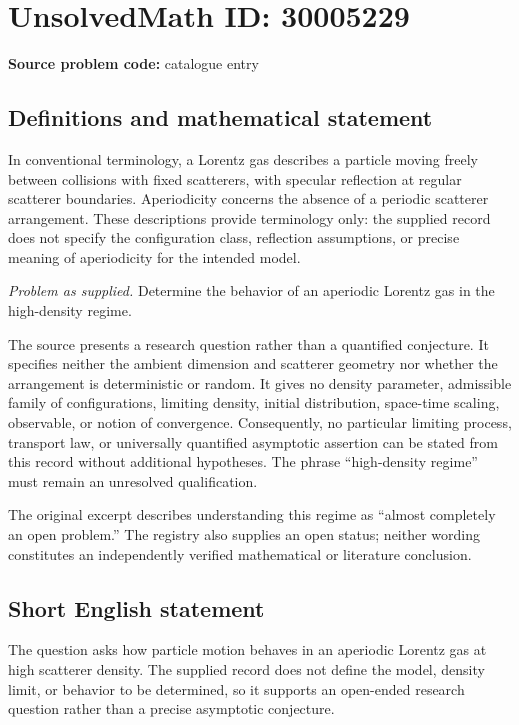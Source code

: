 \documentclass[11pt]{article}
\begin{document}
\section*{UnsolvedMath ID: 30005229}
\textbf{Source problem code:} catalogue entry
\subsection{Definitions and mathematical statement}
In conventional terminology, a Lorentz gas describes a particle moving freely between collisions with fixed scatterers, with specular reflection at regular scatterer boundaries. Aperiodicity concerns the absence of a periodic scatterer arrangement. These descriptions provide terminology only: the supplied record does not specify the configuration class, reflection assumptions, or precise meaning of aperiodicity for the intended model.

\emph{Problem as supplied.} Determine the behavior of an aperiodic Lorentz gas in the high-density regime.

The source presents a research question rather than a quantified conjecture. It specifies neither the ambient dimension and scatterer geometry nor whether the arrangement is deterministic or random. It gives no density parameter, admissible family of configurations, limiting density, initial distribution, space-time scaling, observable, or notion of convergence. Consequently, no particular limiting process, transport law, or universally quantified asymptotic assertion can be stated from this record without additional hypotheses. The phrase ``high-density regime'' must remain an unresolved qualification.

The original excerpt describes understanding this regime as ``almost completely an open problem.'' The registry also supplies an open status; neither wording constitutes an independently verified mathematical or literature conclusion.
\subsection{Short English statement}
The question asks how particle motion behaves in an aperiodic Lorentz gas at high scatterer density. The supplied record does not define the model, density limit, or behavior to be determined, so it supports an open-ended research question rather than a precise asymptotic conjecture.
\end{document}
